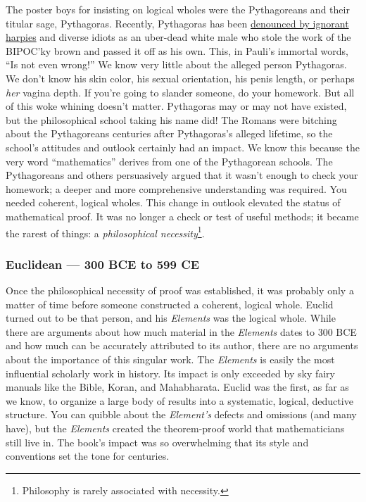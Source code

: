 The poster boys for insisting on logical wholes were the Pythagoreans
and their titular sage, Pythagoras. Recently, Pythagoras has been
\href{https://analyzethedatanotthedrivel.org/2022/09/28/on-eponymous-erasure/}{denounced
by ignorant harpies} and diverse idiots as an uber-dead white male who
stole the work of the BIPOC'ky brown and passed it off as his own. This,
in Pauli's immortal words, ``Is not even wrong!'' We know very little
about the alleged person Pythagoras. We don't know his skin color, his
sexual orientation, his penis length, or perhaps \emph{her} vagina
depth. If you're going to slander someone, do your homework. But all of
this woke whining doesn't matter. Pythagoras may or may not have
existed, but the philosophical school taking his name did! The Romans
were bitching about the Pythagoreans centuries after Pythagoras's
alleged lifetime, so the school's attitudes and outlook certainly had an
impact. We know this because the very word ``mathematics'' derives from
one of the Pythagorean schools. The Pythagoreans and others persuasively
argued that it wasn't enough to check your homework; a deeper and more
comprehensive understanding was required. You needed coherent, logical
wholes. This change in outlook elevated the status of mathematical
proof. It was no longer a check or test of useful methods; it became the
rarest of things: a \emph{philosophical
necessity}\footnote{Philosophy is rarely associated with necessity.}.

\subsubsection*{Euclidean --- 300 BCE to 599 CE}%

Once the philosophical necessity of proof was established, it was
probably only a matter of time before someone constructed a coherent,
logical whole. Euclid turned out to be that person, and his
\emph{Elements} was the logical whole. While there are arguments about
how much material in the \emph{Elements} dates to 300 BCE and how much
can be accurately attributed to its author, there are no arguments about
the importance of this singular work. The \emph{Elements} is easily the
most influential scholarly work in history. Its impact is only exceeded
by sky fairy manuals like the Bible, Koran, and Mahabharata. Euclid was
the first, as far as we know, to organize a large body of results into a
systematic, logical, deductive structure. You can quibble about the
\emph{Element's} defects and omissions (and many have), but the
\emph{Elements} created the theorem-proof world that mathematicians
still live in. The book's impact was so overwhelming that its style and
conventions set the tone for centuries.

